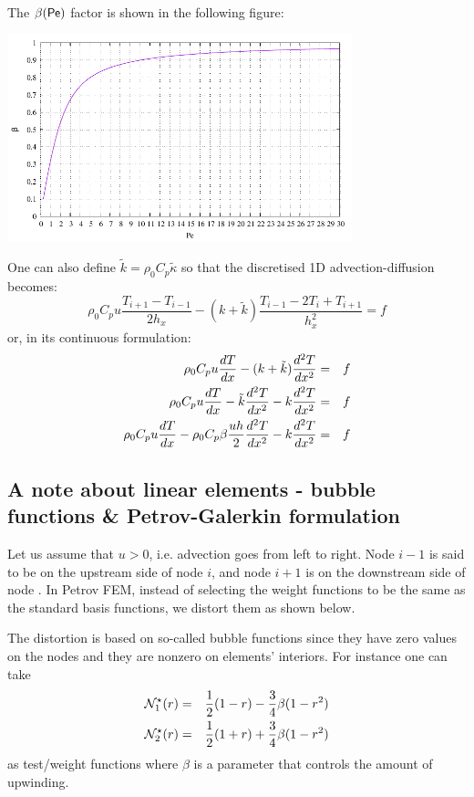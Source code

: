 The $\beta({\mathsf{Pe}})$ factor is shown in the following figure:
\begin{center}
\includegraphics[width=10cm]{images/supg/beta1}
\end{center}


One can also define $\tilde{k}=\rho_0 C_p \tilde{\kappa}$ so that 
the discretised 1D advection-diffusion becomes:
\begin{equation}
\rho_0 C_p u \frac{T_{i+1}-T_{i-1}}{2h_x}
- (k+ \tilde{k}) \frac{T_{i-1}-2T_i+T_{i+1}}{h_x^2}
= f 
\end{equation}
or, in its continuous formulation:
\begin{eqnarray}
\rho_0 C_p u \frac{dT}{dx} - (k+ \tilde{k}) \frac{d^2T}{dx^2} &=& f \nonumber\\
\rho_0 C_p u \frac{dT}{dx}
- \tilde{k} \frac{d^2T}{dx^2} 
- k \frac{d^2T}{dx^2} &=& f \nonumber\\
\rho_0 C_p u \frac{dT}{dx}
- \rho_0 C_p \beta \frac{u h}{2} \frac{d^2T}{dx^2} 
- k \frac{d^2T}{dx^2} &=& f
\end{eqnarray}





\subsection{A note about linear elements - bubble functions \& Petrov-Galerkin formulation}

Let us assume that $u>0$, i.e. advection goes from left to right. 
Node $i-1$ is said to be on the upstream side of node $i$, and node $i+1$
is on the downstream side of node . In Petrov FEM, instead of selecting the weight functions to be the
same as the standard basis functions, we distort them as shown below.

The distortion is based on so-called bubble functions since they have zero
values on the nodes and they are nonzero on elements' interiors.
For instance one can take
\begin{eqnarray}
{{\mathcal{N}}}^\star_1(r)&=&\frac{1}{2}(1-r)-\frac{3}{4}\beta(1-r^2) \\
{{\mathcal{N}}}^\star_2(r)&=&\frac{1}{2}(1+r)+\frac{3}{4}\beta(1-r^2) 
\end{eqnarray}
as test/weight functions
where $\beta$ is a parameter that controls the amount of upwinding. 

